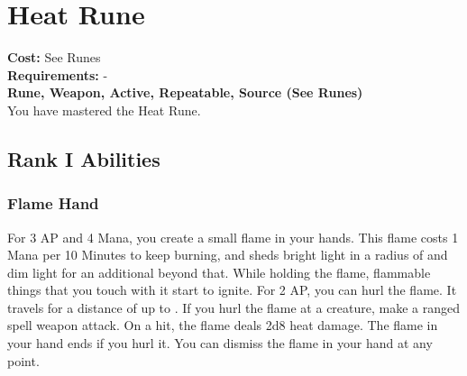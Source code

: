 \section{Heat Rune}\label{rune:heat}
\textbf{Cost:} See Runes\\
\textbf{Requirements:} -\\
\textbf{Rune, Weapon, Active, Repeatable, Source (See Runes)}\\
You have mastered the Heat Rune.

\subsection{Rank I Abilities}

\subsubsection{Flame Hand}
For 3 AP and 4 Mana, you create a small flame in your hands.
This flame costs 1 Mana per 10 Minutes to keep burning, and sheds bright light in a radius of  and dim light for an additional  beyond that.
While holding the flame, flammable things that you touch with it start to ignite.
For 2 AP, you can hurl the flame.
It travels for a distance of up to .
If you hurl the flame at a creature, make a ranged spell weapon attack.
On a hit, the flame deals 2d8 heat damage.
The flame in your hand ends if you hurl it.
You can dismiss the flame in your hand at any point.